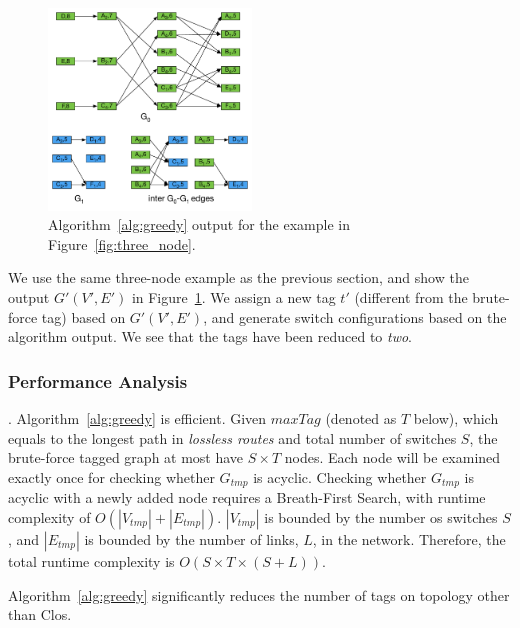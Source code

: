 \begin{figure}[t]
	\centering
	\includegraphics[width=0.48\textwidth] {figs/alo_walkthrough_c}
	\caption{Algorithm~\ref{alg:greedy} output for the example in Figure~\ref{fig:three_node}.}
	\label{fig:greedy}
\end{figure}

We use the same three-node example as the previous section, and show the output 
$G'(V', E')$ in Figure~\ref{fig:greedy}. 
We assign a new tag $t'$ (different from the brute-force tag) based on $G'(V', E')$, 
and generate switch configurations based on the algorithm output. We see that
the tags have been reduced to {\em two}.


\subsubsection{Performance Analysis}\label{subsec:caveats}

. Algorithm~\ref{alg:greedy} is efficient. Given $maxTag$ 
(denoted as $T$ below), which equals to the longest path in {\em lossless routes} and
total number of switches $S$, the brute-force tagged graph at most have $S \times T$ nodes.
Each node will be examined exactly once for checking whether $G_{tmp}$ is acyclic.
Checking whether $G_{tmp}$ is acyclic with a newly added node requires a Breath-First Search,
with runtime complexity of $O(|V_{tmp}| + |E_{tmp}|)$. $|V_{tmp}|$ is bounded by the number
os switches $S$, and $|E_{tmp}|$ is bounded by the number of links, $L$, in the network.
Therefore, the total runtime complexity is $O(S \times T \times (S+L))$.

 Algorithm~\ref{alg:greedy} significantly 
reduces the number of tags on topology other than Clos. 

